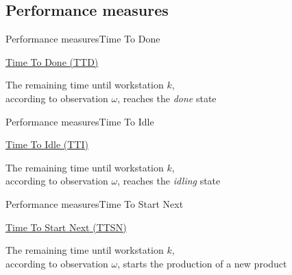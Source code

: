   \subsection{Performance measures}
    \begin{frame}{Performance measures}{Time To Done}
      \begin{center}
        {\huge \underline{Time To Done (TTD)}}
        
        \vspace{1em}
        The remaining time until workstation $k$,\\
        according to observation $\omega$, reaches the \textit{done} state
      \end{center}
      
      \vspace{1em}
      \begin{center}\scalebox{0.9}{}\end{center}
    \end{frame}
    
    \begin{frame}{Performance measures}{Time To Idle}
      \begin{center}
        {\huge \underline{Time To Idle (TTI)}}
        
        \vspace{1em}
        The remaining time until workstation $k$,\\
        according to observation $\omega$, reaches the \textit{idling} state
      \end{center}
      
      \vspace{1em}
      \begin{center}\scalebox{0.9}{}\end{center}
    \end{frame}
    
    \begin{frame}{Performance measures}{Time To Start Next}
      \begin{center}
        {\huge \underline{Time To Start Next (TTSN)}}
        
        \vspace{1em}
        The remaining time until workstation $k$,\\
        according to observation $\omega$, starts the production of a new product
      \end{center}
      
      \vspace{1em}
      \begin{center}\scalebox{0.9}{}\end{center}
    \end{frame}